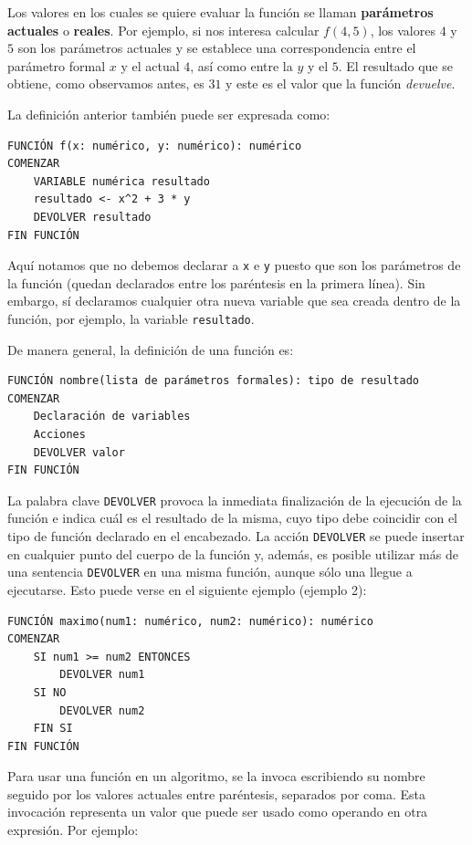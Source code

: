 \documentclass[
]{book}
\begin{document}
Los valores en los cuales se quiere evaluar la función se llaman \textbf{parámetros actuales} o \textbf{reales}. Por ejemplo, si nos interesa calcular \(f(4, 5)\), los valores \(4\) y \(5\) son los parámetros actuales y se establece una correspondencia entre el parámetro formal \(x\) y el actual \(4\), así como entre la \(y\) y el \(5\). El resultado que se obtiene, como observamos antes, es \(31\) y este es el valor que la función \emph{devuelve}.

La definición anterior también puede ser expresada como:

\begin{verbatim}
FUNCIÓN f(x: numérico, y: numérico): numérico
COMENZAR
    VARIABLE numérica resultado
    resultado <- x^2 + 3 * y
    DEVOLVER resultado
FIN FUNCIÓN
\end{verbatim}

Aquí notamos que no debemos declarar a \texttt{x} e \texttt{y} puesto que son los parámetros de la función (quedan declarados entre los paréntesis en la primera línea). Sin embargo, sí declaramos cualquier otra nueva variable que sea creada dentro de la función, por ejemplo, la variable \texttt{resultado}.

De manera general, la definición de una función es:

\begin{verbatim}
FUNCIÓN nombre(lista de parámetros formales): tipo de resultado
COMENZAR
    Declaración de variables
    Acciones
    DEVOLVER valor
FIN FUNCIÓN
\end{verbatim}

La palabra clave \texttt{DEVOLVER} provoca la inmediata finalización de la ejecución de la función e indica cuál es el resultado de la misma, cuyo tipo debe coincidir con el tipo de función declarado en el encabezado. La acción \texttt{DEVOLVER} se puede insertar en cualquier punto del cuerpo de la función y, además, es posible utilizar más de una sentencia \texttt{DEVOLVER} en una misma función, aunque sólo una llegue a ejecutarse. Esto puede verse en el siguiente ejemplo (ejemplo 2):

\begin{verbatim}
FUNCIÓN maximo(num1: numérico, num2: numérico): numérico
COMENZAR
    SI num1 >= num2 ENTONCES
        DEVOLVER num1
    SI NO
        DEVOLVER num2
    FIN SI
FIN FUNCIÓN
\end{verbatim}

Para usar una función en un algoritmo, se la invoca escribiendo su nombre seguido por los valores actuales entre paréntesis, separados por coma. Esta invocación representa un valor que puede ser usado como operando en otra expresión. Por ejemplo:
\end{document}
